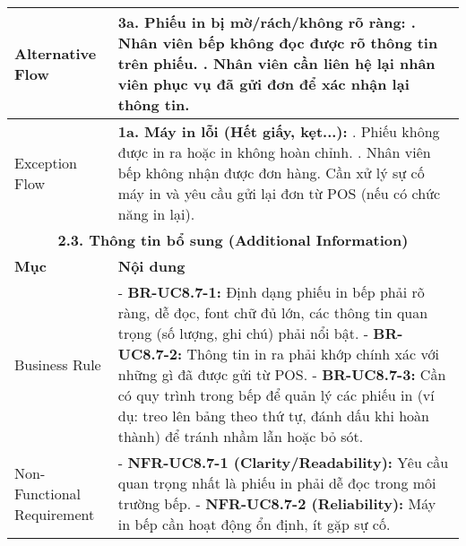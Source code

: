 \begin{longtable}{|m{4cm}|p{11cm}|}
\hline
Alternative Flow & \textbf{3a. Phiếu in bị mờ/rách/không rõ ràng:} \newline    1. Nhân viên bếp không đọc được rõ thông tin trên phiếu. \newline    2. Nhân viên cần liên hệ lại nhân viên phục vụ đã gửi đơn để xác nhận lại thông tin. \\
\hline
Exception Flow & \textbf{1a. Máy in lỗi (Hết giấy, kẹt...):} \newline    1. Phiếu không được in ra hoặc in không hoàn chỉnh. \newline    2. Nhân viên bếp không nhận được đơn hàng. Cần xử lý sự cố máy in và yêu cầu gửi lại đơn từ POS (nếu có chức năng in lại). \\
\hline
\multicolumn{2}{|c|}{\textbf{2.3. Thông tin bổ sung (Additional Information)}} \\
\hline
\textbf{Mục} & \textbf{Nội dung} \\
\hline
Business Rule & - \textbf{BR-UC8.7-1:} Định dạng phiếu in bếp phải rõ ràng, dễ đọc, font chữ đủ lớn, các thông tin quan trọng (số lượng, ghi chú) phải nổi bật. \newline - \textbf{BR-UC8.7-2:} Thông tin in ra phải khớp chính xác với những gì đã được gửi từ POS. \newline - \textbf{BR-UC8.7-3:} Cần có quy trình trong bếp để quản lý các phiếu in (ví dụ: treo lên bảng theo thứ tự, đánh dấu khi hoàn thành) để tránh nhầm lẫn hoặc bỏ sót. \\
\hline
Non-Functional Requirement & - \textbf{NFR-UC8.7-1 (Clarity/Readability):} Yêu cầu quan trọng nhất là phiếu in phải dễ đọc trong môi trường bếp. \newline - \textbf{NFR-UC8.7-2 (Reliability):} Máy in bếp cần hoạt động ổn định, ít gặp sự cố. \\
\hline
\end{longtable}


